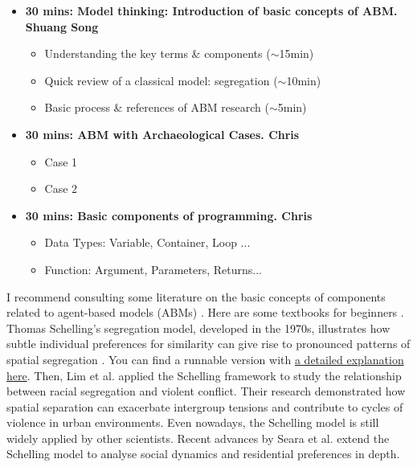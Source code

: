 
\begin{itemize}
\item \textbf{30 mins: Model thinking: Introduction of basic concepts of ABM. Shuang Song}
	\begin{itemize}
	\item Understanding the key terms \& components ($\sim$15min)
	\item Quick review of a classical model: segregation ($\sim$10min)
	\item Basic process \& references of ABM research ($\sim$5min)
	\end{itemize}
\item \textbf{30 mins: ABM with Archaeological Cases. Chris}
	\begin{itemize}
	\item Case 1
	\item Case 2
	\end{itemize}
\item \textbf{30 mins: Basic components of programming. Chris}
	\begin{itemize}
	\item Data Types: Variable, Container, Loop ...
	\item Function: Argument, Parameters, Returns...
	\end{itemize}
\end{itemize}

I recommend consulting some literature on the basic concepts of components related to agent-based models (ABMs) \cite{beckage2022, schulze2017, romanowska2019, matthews2007, schluter2023}. Here are some textbooks for beginners \cite{crooks2018, miller2022, wurzer2014}. Thomas Schelling's segregation model, developed in the 1970s, illustrates how subtle individual preferences for similarity can give rise to pronounced patterns of spatial segregation \cite{schelling1971}. You can find a runnable version with \href{http://nifty.stanford.edu/2014/mccown-schelling-model-segregation/}{a detailed explanation here}. Then, Lim et al. \cite{lim2007} applied the Schelling framework to study the relationship between racial segregation and violent conflict. Their research demonstrated how spatial separation can exacerbate intergroup tensions and contribute to cycles of violence in urban environments. Even nowadays, the Schelling model is still widely applied by other scientists. Recent advances by Seara et al. \cite{seara2025} extend the Schelling model to analyse social dynamics and residential preferences in depth.
